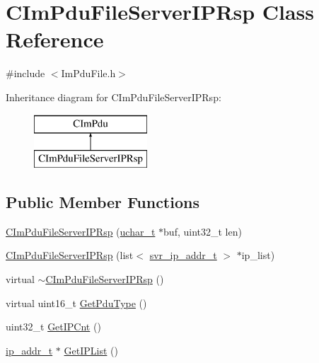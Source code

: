 \hypertarget{class_c_im_pdu_file_server_i_p_rsp}{}\section{C\+Im\+Pdu\+File\+Server\+I\+P\+Rsp Class Reference}
\label{class_c_im_pdu_file_server_i_p_rsp}


{\ttfamily \#include $<$Im\+Pdu\+File.\+h$>$}

Inheritance diagram for C\+Im\+Pdu\+File\+Server\+I\+P\+Rsp\+:\begin{figure}[H]
\begin{center}
\leavevmode
\includegraphics[height=2.000000cm]{class_c_im_pdu_file_server_i_p_rsp}
\end{center}
\end{figure}
\subsection*{Public Member Functions}
\begin{DoxyCompactItemize}
\item 
\hyperlink{class_c_im_pdu_file_server_i_p_rsp_a0a59ea6c262b2234035ae7f1798fbd70}{C\+Im\+Pdu\+File\+Server\+I\+P\+Rsp} (\hyperlink{base_2ostype_8h_a124ea0f8f4a23a0a286b5582137f0b8d}{uchar\+\_\+t} $\ast$buf, uint32\+\_\+t len)
\item 
\hyperlink{class_c_im_pdu_file_server_i_p_rsp_af09962143df0e94d805ac42aa6c51577}{C\+Im\+Pdu\+File\+Server\+I\+P\+Rsp} (list$<$ \hyperlink{structsvr__ip__addr__t}{svr\+\_\+ip\+\_\+addr\+\_\+t} $>$ $\ast$ip\+\_\+list)
\item 
virtual \hyperlink{class_c_im_pdu_file_server_i_p_rsp_a29a9e15e698e40820d88fe5f4b447aa3}{$\sim$\+C\+Im\+Pdu\+File\+Server\+I\+P\+Rsp} ()
\item 
virtual uint16\+\_\+t \hyperlink{class_c_im_pdu_file_server_i_p_rsp_a2b97ca7ae4efc953b44c154eaeb48e22}{Get\+Pdu\+Type} ()
\item 
uint32\+\_\+t \hyperlink{class_c_im_pdu_file_server_i_p_rsp_a5c7fa05515b7ed2134e8dcc5a3d33793}{Get\+I\+P\+Cnt} ()
\item 
\hyperlink{structip__addr__t}{ip\+\_\+addr\+\_\+t} $\ast$ \hyperlink{class_c_im_pdu_file_server_i_p_rsp_ad0173fb6c279793303a040ce6c25b90c}{Get\+I\+P\+List} ()
\end{DoxyCompactItemize}
